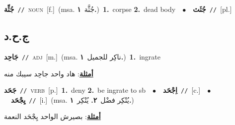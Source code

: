 \documentclass[10pt,a4paper,twoside]{article} %
\begin{document}
\begin{multicols}{2}
{\setlength\topsep{0pt}\textbf{\foreignlanguage{arabic}{جُثِّة}}\ {\color{gray}\texttt{//}\color{black}}\ \textsc{noun}\ [f.]\ \color{gray}(msa. \foreignlanguage{arabic}{جُثَّة}~\foreignlanguage{arabic}{\textbf{١.}})\color{black}\ \textbf{1.}~corpse  \textbf{2.}~dead body\ \ $\bullet$\ \ \setlength\topsep{0pt}\textbf{\foreignlanguage{arabic}{جُثَث}}\ {\color{gray}\texttt{//}\color{black}}\ [pl.]\ } \vspace{2mm}

\vspace{-3mm}
\subsection*{\color{blue}\foreignlanguage{arabic}{ج.ح.د}\color{blue}{}} 

{\setlength\topsep{0pt}\textbf{\foreignlanguage{arabic}{جَاحِد}}\ {\color{gray}\texttt{//}\color{black}}\ \textsc{adj}\ [m.]\ \color{gray}(msa. \foreignlanguage{arabic}{ناكِر للجميل}~\foreignlanguage{arabic}{\textbf{١.}})\color{black}\ \textbf{1.}~ingrate\  \begin{flushright}\color{gray}\foreignlanguage{arabic}{\textbf{\underline{\foreignlanguage{arabic}{أمثلة}}}: هاد واحد جاحِد سيبك منه}\end{flushright}\color{black}} \vspace{2mm}

{\setlength\topsep{0pt}\textbf{\foreignlanguage{arabic}{جَحَد}}\ {\color{gray}\texttt{//}\color{black}}\ \textsc{verb}\ [p.]\ \textbf{1.}~deny  \textbf{2.}~be ingrate to sb\ \ $\bullet$\ \ \setlength\topsep{0pt}\textbf{\foreignlanguage{arabic}{اِجْحَد}}\ {\color{gray}\texttt{//}\color{black}}\ [c.]\ \ $\bullet$\ \ \setlength\topsep{0pt}\textbf{\foreignlanguage{arabic}{يِجْحَد}}\ {\color{gray}\texttt{//}\color{black}}\ [i.]\ \color{gray}(msa. \foreignlanguage{arabic}{يُنْكِر فضْل}~\foreignlanguage{arabic}{\textbf{٢.}}  \foreignlanguage{arabic}{يُنْكِر}~\foreignlanguage{arabic}{\textbf{١.}})\color{black}\  \begin{flushright}\color{gray}\foreignlanguage{arabic}{\textbf{\underline{\foreignlanguage{arabic}{أمثلة}}}: بصيرش الواحد يِجْحَد النعمة}\end{flushright}\color{black}} \vspace{2mm}


\end{multicols}
\end{document}
